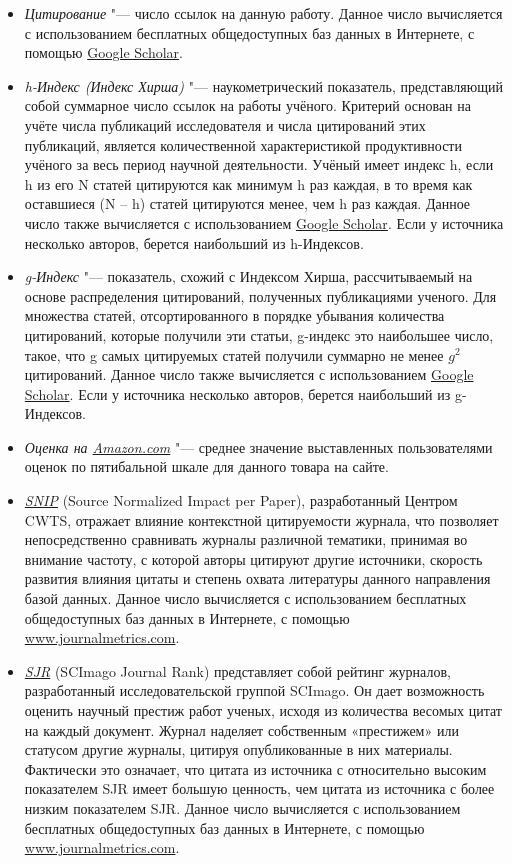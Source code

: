 \documentclass{article}
\begin{document}
	\begin{itemize}
		\item \textit{Цитирование} "--- число ссылок на данную работу. Данное число вычисляется с использованием бесплатных общедоступных баз данных в Интернете, с помощью \href{http://scholar.google.ru/schhp?hl=ru&as_sdt=0,5}{Google Scholar}.
		\item \textit{h-Индекс (Индекс Хирша)} "--- наукометрический показатель, представляющий собой суммарное число ссылок на работы учёного. Критерий основан на учёте числа публикаций исследователя и числа цитирований этих публикаций, является количественной характеристикой продуктивности учёного за весь период научной деятельности. Учёный имеет индекс h, если h из его N статей цитируются как минимум h раз каждая, в то время как оставшиеся (N – h) статей цитируются менее, чем h раз каждая. Данное число также вычисляется с использованием \href{http://scholar.google.ru/schhp?hl=ru&as_sdt=0,5}{Google Scholar}. Если у источника несколько авторов, берется наибольший из h-Индексов.
		\item \textit{g-Индекс} "--- показатель, схожий с Индексом Хирша, рассчитываемый на основе распределения цитирований, полученных публикациями ученого. Для множества статей, отсортированного в порядке убывания количества цитирований, которые получили эти статьи, g-индекс это наибольшее число, такое, что g самых цитируемых статей получили суммарно не менее $g^2$ цитирований. Данное число также вычисляется с использованием \href{http://scholar.google.ru/schhp?hl=ru&as_sdt=0,5}{Google Scholar}. Если у источника несколько авторов, берется наибольший из g-Индексов.
		\item \textit{Оценка на \href{http://www.amazon.com/}{Amazon.com}} "--- среднее значение выставленных пользователями оценок по пятибальной шкале для данного товара на сайте. 
		\item \textit{\href{http://arxiv.org/abs/0911.2632}{SNIP}} (Source Normalized Impact per Paper), разработанный Центром CWTS, отражает влияние контекстной цитируемости журнала, что позволяет непосредственно сравнивать журналы различной тематики, принимая во внимание частоту, с которой авторы цитируют другие источники, скорость развития влияния цитаты и степень охвата литературы данного направления базой данных. Данное число вычисляется с использованием бесплатных общедоступных баз данных в Интернете, с помощью \href{http://www.journalmetrics.com/}{www.journalmetrics.com}.
		\item \textit{\href{http://arxiv.org/abs/0912.4141}{SJR}} (SCImago Journal Rank) представляет собой рейтинг журналов, разработанный исследовательской группой SCImago. Он дает возможность оценить научный престиж работ ученых, исходя из количества весомых цитат на каждый документ. Журнал наделяет собственным «престижем» или статусом другие журналы, цитируя опубликованные в них материалы. Фактически это означает, что цитата из источника с относительно высоким показателем SJR имеет большую ценность, чем цитата из источника с более низким показателем SJR. Данное число вычисляется с использованием бесплатных общедоступных баз данных в Интернете, с помощью \href{http://www.journalmetrics.com/}{www.journalmetrics.com}.
	\end{itemize}
	
\end{document}
